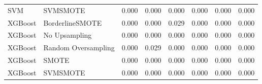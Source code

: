 \begin{tabular}{llllllll}
                            SVM &                      SVMSMOTE &     0.000 &                     0.000 &                 0.000 &                  0.000 &                                   0.000 &     0.000 \\
                        XGBoost &               BorderlineSMOTE &     0.000 &                     0.000 &                 0.029 &                  0.000 &                                   0.000 &     0.000 \\
                        XGBoost &                 No Upsampling &     0.000 &                     0.000 &                 0.000 &                  0.000 &                                   0.000 &     0.000 \\
                        XGBoost &           Random Oversampling &     0.000 &                     0.029 &                 0.000 &                  0.000 &                                   0.000 &     0.000 \\
                        XGBoost &                         SMOTE &     0.000 &                     0.000 &                 0.000 &                  0.000 &                                   0.000 &     0.000 \\
                        XGBoost &                      SVMSMOTE &     0.000 &                     0.000 &                 0.000 &                  0.000 &                                   0.000 &     0.000 \\
\bottomrule
\end{tabular}
